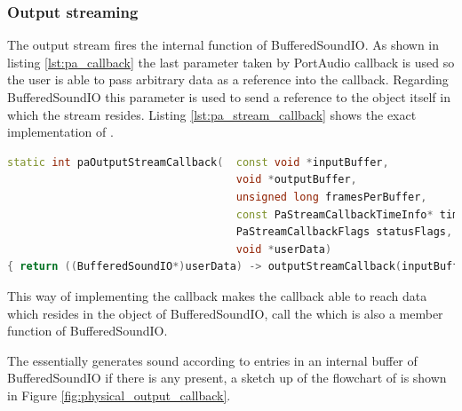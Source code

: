 		\subsubsection{Output streaming}
		The output stream fires the internal  function of BufferedSoundIO. As shown in listing \ref{lst:pa_callback}
		the last parameter taken by PortAudio callback  is used so the user is able to pass arbitrary data as a reference into the
		callback. Regarding BufferedSoundIO this parameter is used to send a reference to the object itself in which the stream resides. 
		Listing \ref{lst:pa_stream_callback} shows the exact implementation of .
		
		\begin{lstlisting}[float=htb,language={C++},caption={Implementation of \smalltt{paOutputStreamCallback}},label={lst:pa_stream_callback}]
static int paOutputStreamCallback(	const void *inputBuffer,
									void *outputBuffer,
									unsigned long framesPerBuffer,
									const PaStreamCallbackTimeInfo* timeInfo,
									PaStreamCallbackFlags statusFlags,
									void *userData)
{ return ((BufferedSoundIO*)userData) -> outputStreamCallback(inputBuffer, outputBuffer, framesPerBuffer, timeInfo, statusFlags); }
		\end{lstlisting}
		
		This way of implementing the callback makes the callback able to reach data which resides in the object of BufferedSoundIO,
		 call the  which is also a member function of BufferedSoundIO.
		
		The  essentially generates sound according to entries in an internal buffer of BufferedSoundIO
		if there is any present, a sketch up of the flowchart of  is shown in Figure \ref{fig:physical_output_callback}.
		
